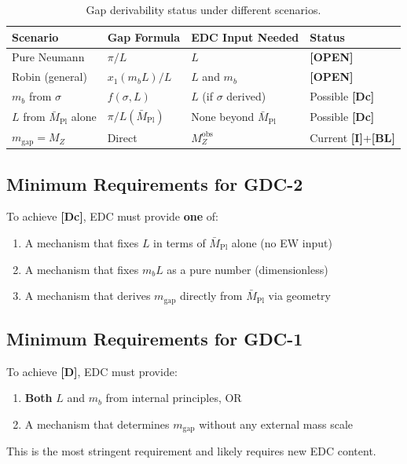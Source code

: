 \documentclass[11pt,a4paper]{article}
\newcommand{\Mpl}{\bar{M}_{\mathrm{Pl}}}
\newcommand{\mgap}{m_{\mathrm{gap}}}
\newcommand{\mb}{m_b}
\newcommand{\MZ}{M_Z}
\newcommand{\tagD}{\textbf{[D]}}
\newcommand{\tagDc}{\textbf{[Dc]}}
\newcommand{\tagI}{\textbf{[I]}}
\newcommand{\tagBL}{\textbf{[BL]}}
\newcommand{\tagOPEN}{\textbf{[OPEN]}}
\theoremstyle{definition}
\theoremstyle{plain}
\theoremstyle{remark}
\begin{document}
\begin{table}[htbp]
\centering
\caption{Gap derivability status under different scenarios.}
\label{tab:derivability}
\begin{tabular}{@{}llll@{}}
\toprule
Scenario & Gap Formula & EDC Input Needed & Status \\
\midrule
Pure Neumann & $\pi/L$ & $L$ & \tagOPEN{} \\
Robin (general) & $x_1(\mb L)/L$ & $L$ and $\mb$ & \tagOPEN{} \\
$\mb$ from $\sigma$ & $f(\sigma, L)$ & $L$ (if $\sigma$ derived) & Possible \tagDc{} \\
$L$ from $\Mpl$ alone & $\pi/L(\Mpl)$ & None beyond $\Mpl$ & Possible \tagDc{} \\
$\mgap = \MZ$ & Direct & $\MZ^{\mathrm{obs}}$ & Current \tagI{}+\tagBL{} \\
\bottomrule
\end{tabular}
\end{table}

\subsection{Minimum Requirements for GDC-2}

To achieve \tagDc{}, EDC must provide \textbf{one} of:
\begin{enumerate}
\item A mechanism that fixes $L$ in terms of $\Mpl$ alone (no EW input)
\item A mechanism that fixes $\mb L$ as a pure number (dimensionless)
\item A mechanism that derives $\mgap$ directly from $\Mpl$ via geometry
\end{enumerate}

\subsection{Minimum Requirements for GDC-1}

To achieve \tagD{}, EDC must provide:
\begin{enumerate}
\item \textbf{Both} $L$ and $\mb$ from internal principles, OR
\item A mechanism that determines $\mgap$ without any external mass scale
\end{enumerate}

This is the most stringent requirement and likely requires new EDC content.
\end{document}
